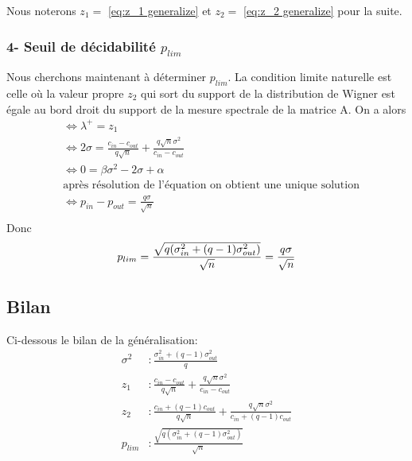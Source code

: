 Nous noterons $z_1 =$ \eqref{eq:z_1 generalize}  et $z_2 =$ \eqref{eq:z_2 generalize} pour la suite.
 

\subsubsection*{4- Seuil de décidabilité $p_{lim}$}
Nous cherchons maintenant à déterminer $p_{lim}$.
La condition limite naturelle est celle où la valeur propre $z_2$ qui sort du support de la distribution de Wigner est égale au bord droit du support de la mesure spectrale de la matrice A.
On a alors 
\begin{align*}
	&\Leftrightarrow \lambda^+ = z_1\\
	&\Leftrightarrow 2 \sigma = \frac{c_{in} - c_{out}}{q\sqrt{n}} + \frac{q\sqrt{n}\sigma^2}{c_{in} - c_{out}}\\
	&\Leftrightarrow 0 = \beta \sigma^2 - 2 \sigma + \alpha \\
	&\text{après résolution de l'équation on obtient une unique solution}\\
	&\Leftrightarrow p_{in} - p_{out} = \frac{q\sigma}{\sqrt{n}}  \\
\end{align*}
Donc
\begin{equation}
	p_{lim} = \frac{\sqrt{q(\sigma_{in}^2 + (q-1)\sigma_{out}^2)}}{\sqrt{n}} = \frac{q\sigma}{\sqrt{n}}  \\
\end{equation}


\subsection{Bilan}
Ci-dessous le bilan de la généralisation:
\begin{align*}
	\sigma^2&: \frac{\sigma_{in}^2 + (q-1)\sigma_{out}^2}{q} \\
	z_1&: \frac{c_{in} - c_{out}}{q\sqrt{n}} + \frac{q\sqrt{n}\sigma^2}{c_{in} - c_{out}}\\
	z_2&: \frac{c_{in} + (q-1)c_{out}}{q\sqrt{n}} + \frac{q\sqrt{n}\sigma^2}{c_{in} + (q-1)c_{out}}\\
	p_{lim}&: \frac{\sqrt{q(\sigma_{in}^2 + (q-1)\sigma_{out}^2)}}{\sqrt{n}} \\
\end{align*}

